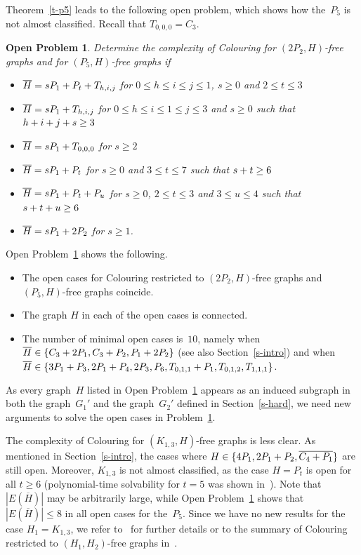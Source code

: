 \documentclass{llncs}
\newtheorem{oproblem}{Open Problem}
\begin{document}
Theorem~\ref{t-p5} leads to the following open problem, which shows how the~$P_5$ is not almost classified.
Recall that $T_{0,0,0}=C_3$.

\begin{oproblem}\label{o-p5}
Determine the complexity of {\sc Colouring} for $(2P_2,H)$-free graphs and for $(P_5,H)$-free graphs if
\begin{itemize}
\item $\overline{H}=sP_1+\nobreak P_t+\nobreak T_{h,i,j}$ for $0\leq h\leq i\leq j \leq 1$, $s\geq 0$ and $2\leq t\leq 3$
\item $\overline{H}=sP_1+\nobreak T_{h,i,j}$ for $0\leq h\leq i\leq1\leq j\leq 3$ and $s\geq 0$ such that $h+\nobreak i+\nobreak j+\nobreak s\geq 3$
\item $\overline{H}=sP_1+\nobreak T_{0,0,0}$ for $s\geq 2$
\item $\overline{H}=sP_1+\nobreak P_t$ for $s\geq 0$ and $3\leq t\leq 7$ such that $s+\nobreak t\geq 6$
\item $\overline{H}=sP_1+\nobreak P_t+\nobreak P_u$ for $s\geq 0$, $2\leq t\leq 3$ and $3 \leq u \leq 4$ such that $s+\nobreak t+\nobreak u \geq 6$
\item $\overline{H}=sP_1+\nobreak 2P_2$ for $s\geq 1$.
\end{itemize}
\end{oproblem}
Open Problem~\ref{o-p5} shows the following.
\begin{itemize}
\item The open cases for {\sc Colouring} restricted to $(2P_2,H)$-free graphs and $(P_5,H)$-free graphs coincide.\\[-10pt]
\item The graph $H$ in each of the open cases is connected.\\[-10pt]
\item The number of minimal open cases is~$10$, namely when $\overline{H}\in \{C_3+\nobreak 2P_1,C_3+\nobreak P_2,P_1+\nobreak 2P_2\}$ (see also Section~\ref{s-intro}) and when  $\overline{H}\in \{3P_1+\nobreak P_3, 2P_1+\nobreak P_4, 2P_3, P_6, T_{0,1,1}+\nobreak P_1, T_{0,1,2}, T_{1,1,1}\}$.
\end{itemize}
As every graph~$H$ listed in Open Problem~\ref{o-p5} appears as an induced subgraph in both the graph~$G_1'$ and the graph~$G_2'$ defined in Section~\ref{s-hard}, we need new arguments to solve the open cases in Problem~\ref{o-p5}.

The complexity of {\sc Colouring} for $(K_{1,3},H)$-free graphs is less clear.
As mentioned in Section~\ref{s-intro}, the cases where $H\in \{4P_1,2P_1+\nobreak P_2,\overline{C_4+P_1}\}$ are still open.
Moreover, $K_{1,3}$ is not almost classified, as the case $H=P_t$ is open for all $t\geq 6$ (polynomial-time solvability for $t=5$ was shown in~\cite{Ma13}).
Note that $|E(\overline{H})|$ may be arbitrarily large, while Open Problem~\ref{o-p5} shows that $|E(\overline{H})|\leq 8$ in all open cases for the~$P_5$.
Since we have no new results for the case $H_1=K_{1,3}$, we refer to~\cite{LP14} for further details or to the summary of {\sc Colouring} restricted to $(H_1,H_2)$-free graphs in~\cite{GJPS}.
\end{document}
